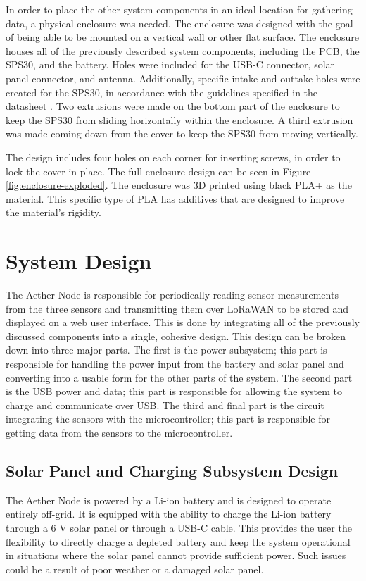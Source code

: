 \documentclass[conference]{IEEEtran}
\newcommand*{\lorawan}{LoRaWAN\xspace}
\begin{document}
In order to place the other system components in an ideal location for gathering data, a physical enclosure was needed. The enclosure was designed with the goal of being able to be mounted on a vertical wall or other flat surface. The enclosure houses all of the previously described system components, including the PCB, the SPS30, and the battery. Holes were included for the USB-C connector, solar panel connector, and antenna. Additionally, specific intake and outtake holes were created for the SPS30, in accordance with the guidelines specified in the datasheet \cite{sps30-datahsheet}. Two extrusions were made on the bottom part of the enclosure to keep the SPS30 from sliding horizontally within the enclosure. A third extrusion was made coming down from the cover to keep the SPS30 from moving vertically. 

The design includes four holes on each corner for inserting screws, in order to lock the cover in place. The full enclosure design can be seen in Figure \ref{fig:enclosure-exploded}. The enclosure was 3D printed using black PLA+ as the material. This specific type of PLA has additives that are designed to improve the material's rigidity.

\section{System Design}
The Aether Node is responsible for periodically reading sensor measurements from the three sensors and transmitting them over \lorawan to be stored and displayed on a web user interface. This is done by integrating all of the previously discussed components into a single, cohesive design. This design can be broken down into three major parts. The first is the power subsystem; this part is responsible for handling the power input from the battery and solar panel and converting into a usable form for the other parts of the system. The second part is the USB power and data; this part is responsible for allowing the system to charge and communicate over USB. The third and final part is the circuit integrating the sensors with the microcontroller; this part is responsible for getting data from the sensors to the microcontroller.

\subsection{Solar Panel and Charging Subsystem Design}
The Aether Node is powered by a Li-ion battery and is designed to operate entirely off-grid. It is equipped with the ability to charge the Li-ion battery through a 6 V solar panel or through a USB-C cable. This provides the user the flexibility to directly charge a depleted battery and keep the system operational in situations where the solar panel cannot provide sufficient power. Such issues could be a result of poor weather or a damaged solar panel. 
\end{document}

